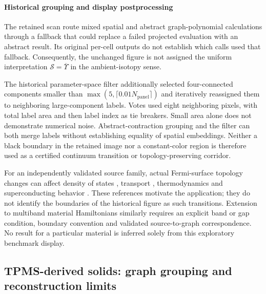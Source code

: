 \paragraph{Historical grouping and display postprocessing}
The retained scan route mixed spatial and abstract graph-polynomial calculations through a fallback that could replace a failed projected evaluation with an abstract result. Its original per-cell outputs do not establish which calls used that fallback. Consequently, the unchanged figure is not assigned the uniform interpretation $\mathcal S=\overline{\Upsilon}$ in the ambient-isotopy sense.

The historical parameter-space filter additionally selected four-connected components smaller than $\max(5,\lceil0.01N_{\mathrm{panel}}\rceil)$ and iteratively reassigned them to neighboring large-component labels. Votes used eight neighboring pixels, with total label area and then label index as tie breakers. Small area alone does not demonstrate numerical noise. Abstract-contraction grouping and the filter can both merge labels without establishing equality of spatial embeddings. Neither a black boundary in the retained image nor a constant-color region is therefore used as a certified continuum transition or topology-preserving corridor.

For an independently validated source family, actual Fermi-surface topology changes can affect density of states \cite{kg_galeski2022lifshitz,kg_ichinokura2022lifshitz}, transport \cite{kg_galeski2022lifshitz}, thermodynamics \cite{kg_slizovskiy2015lifshitz} and superconducting behavior \cite{kg_shi2017lifshitz}. These references motivate the application; they do not identify the boundaries of the historical figure as such transitions. Extension to multiband material Hamiltonians similarly requires an explicit band or gap condition, boundary convention and validated source-to-graph correspondence. No result for a particular material is inferred solely from this exploratory benchmark display.

\subsection{TPMS-derived solids: graph grouping and reconstruction limits}
\label{supp:tpms_phase_maps}
\label{sec:tpms_design_maps}

